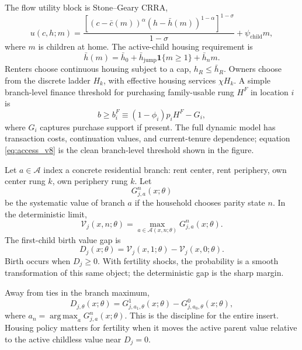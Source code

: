 \documentclass[11pt]{article}
\newcommand{\mc}{\mathcal}
\newcommand{\one}{\mathbf 1}
\newcommand{\argmax}{\operatorname*{arg\,max}}
\newcommand{\gap}{D}
\theoremstyle{remark}
\begin{document}
The flow utility block is Stone--Geary CRRA,
\begin{equation}
 u(c,h;m)=
 \frac{\left[(c-\bar c(m))^\alpha(h-\bar h(m))^{1-\alpha}\right]^{1-\sigma}}{1-\sigma}
 +\psi_{\mathrm{child}}m,
 \label{eq:utility_v8}
\end{equation}
where \(m\) is children at home.  The active-child housing requirement is
\begin{equation}
  \bar h(m)=\bar h_0+\bar h_{\mathrm{jump}}\one\{m\ge 1\}+\bar h_n m.
  \label{eq:hbar_v8}
\end{equation}
Renters choose continuous housing subject to a cap, \(h_R\le \bar h_R\).  Owners choose from the discrete ladder \(H_k\), with effective housing services \(\chi H_k\).  A simple branch-level finance threshold for purchasing family-usable rung \(H^F\) in location \(i\) is
\begin{equation}
  b \ge b_i^F \equiv (1-\phi_i)p_iH^F-G_i,
  \label{eq:access_v8}
\end{equation}
where \(G_i\) captures purchase support if present.  The full dynamic model has transaction costs, continuation values, and current-tenure dependence; equation \eqref{eq:access_v8} is the clean branch-level threshold shown in the figure.

Let \(a\in\mc A\) index a concrete residential branch: rent center, rent periphery, own center rung \(k\), own periphery rung \(k\).  Let
\begin{equation}
  G^n_{j,a}(x;\theta)
\end{equation}
be the systematic value of branch \(a\) if the household chooses parity state \(n\).  In the deterministic limit,
\begin{equation}
  \mc V_j(x,n;\theta)=\max_{a\in\mc A(x,n;\theta)}G^n_{j,a}(x;\theta).
\end{equation}
The first-child birth value gap is
\begin{equation}
  \gap_j(x;\theta)=\mc V_j(x,1;\theta)-\mc V_j(x,0;\theta).
  \label{eq:D_v8}
\end{equation}
Birth occurs when \(\gap_j\ge 0\).  With fertility shocks, the probability is a smooth transformation of this same object; the deterministic gap is the sharp margin.

Away from ties in the branch maximum,
\begin{equation}
  \gap_{j,\theta}(x;\theta)
  =G^1_{j,a_1,\theta}(x;\theta)-G^0_{j,a_0,\theta}(x;\theta),
  \label{eq:branch_exposure_v8}
\end{equation}
where \(a_n=\argmax_a G^n_{j,a}(x;\theta)\).  This is the discipline for the entire insert.  Housing policy matters for fertility when it moves the active parent value relative to the active childless value near \(\gap_j=0\).
\end{document}
